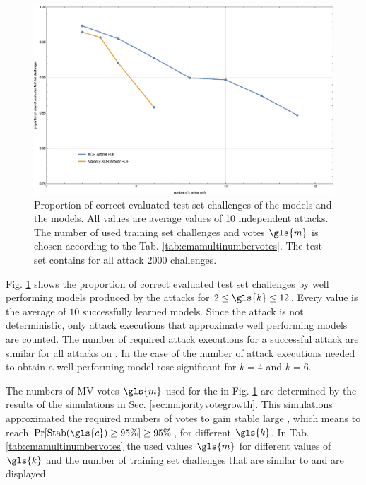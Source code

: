 \begin{figure}[ht]
\includegraphics[width=1.00\textwidth]{images/xor-cma-attack-performance.eps}
\caption[Proportion of correct evaluated test set challenges for \acs{XOR} Arbiter \pufs and Majority \acs{XOR} Arbiter \pufs]{Proportion of correct evaluated test set challenges of the \xpuf models and the \mxpuf models. All values are average values of 10 independent attacks. The number of used training set challenges and votes $\gls{m}$ is chosen according to the Tab. \ref{tab:cmamultinumbervotes}. The test set contains for all attack $2000$ challenges.}
\label{fig:cmamultiattackmodelperformance}
\end{figure}

Fig. \ref{fig:cmamultiattackmodelperformance} shows the proportion of correct evaluated test set challenges by well performing models produced by the attacks for $2 \le \gls{k} \le 12$.
Every value is the average of $10$ successfully learned models.
Since the attack is not deterministic, only attack executions that approximate well performing models are counted.
The number of required attack executions for a successful attack are similar for all attacks on \xpufs.
In the case of \mxpufs the number of attack executions needed to obtain a well performing model rose significant for $k = 4$ and $k = 6$.

The numbers of \ac{MV} votes $\gls{m}$ used for the \mxpufs in Fig. \ref{fig:cmamultiattackmodelperformance} are determined by the results of the simulations in Sec. \ref{sec:majorityvotegrowth}.
This simulations approximated the required numbers of votes to gain stable large \mxpufs, which means to reach $\Pr[\protect\Stab(\gls{c}) \ge 95 \%] \ge 95 \%$, for different $\gls{k}$.
In Tab. \ref{tab:cmamultinumbervotes} the used values $\gls{m}$ for different values of $\gls{k}$ and the number of training set challenges that are similar to \xpufs and \mxpufs are displayed.

